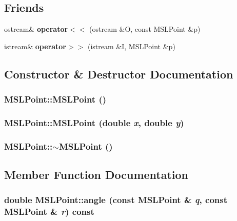 \subsection*{Friends}
\begin{CompactItemize}
\item 
ostream\& {\bf operator$<$$<$} (ostream \&O, const MSLPoint \&p)
\item 
istream\& {\bf operator$>$$>$} (istream \&I, MSLPoint \&p)
\end{CompactItemize}


\subsection{Constructor \& Destructor Documentation}
\subsubsection{\setlength{\rightskip}{0pt plus 5cm}MSLPoint::MSLPoint ()}\label{classMSLPoint_a0}


\subsubsection{\setlength{\rightskip}{0pt plus 5cm}MSLPoint::MSLPoint (double {\em x}, double {\em y})}\label{classMSLPoint_a1}


\subsubsection{\setlength{\rightskip}{0pt plus 5cm}MSLPoint::$\sim$MSLPoint ()\hspace{0.3cm}{\tt  [inline]}}\label{classMSLPoint_a2}




\subsection{Member Function Documentation}
\subsubsection{\setlength{\rightskip}{0pt plus 5cm}double MSLPoint::angle (const MSLPoint \& {\em q}, const MSLPoint \& {\em r}) const}\label{classMSLPoint_a12}


